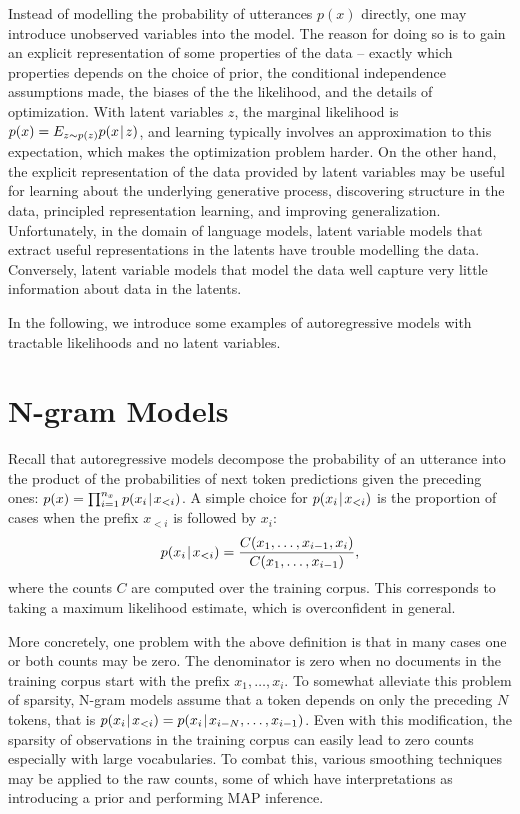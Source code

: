 \documentclass[12pt,a4paper,oneside]{book}
\newcommand{\tmid}{\hspace{0.08em}|\hspace{0.11em}}
\begin{document}
Instead of modelling the probability of utterances $p(x)$ directly, one may introduce unobserved variables into the model.
The reason for doing so is to gain an explicit representation of some properties of the data -- exactly which properties depends on the choice of prior, the conditional independence assumptions made, the biases of the the likelihood, and the details of optimization.
With latent variables $z$, the marginal likelihood is $p(x) = E_{z \sim p(z)} p(x\tmid z)$, and learning typically involves an approximation to this expectation, which makes the optimization problem harder.
On the other hand, the explicit representation of the data provided by latent variables may be useful for learning about the underlying generative process, discovering structure in the data, principled representation learning, and improving generalization.
Unfortunately, in the domain of language models, latent variable models that extract useful representations in the latents have trouble modelling the data.
Conversely, latent variable models that model the data well capture very little information about data in the latents.

In the following, we introduce some examples of autoregressive models with tractable likelihoods and no latent variables.

\section{N-gram Models}

Recall that autoregressive models decompose the probability of an utterance into the product of the probabilities of next token predictions given the preceding ones: $p(x)=\prod_{i=1}^{n_x}p(x_i\tmid x_{<i})$.
A simple choice for $p(x_i\tmid x_{<i})$ is the proportion of cases when the prefix $x_{<i}$ is followed by $x_i$:
{\def\groundprop{1.6}
\begin{equation*}
p(x_i\tmid x_{<i}) = \frac{C(x_1, \dots, x_{i-1}, x_i)}{C(x_1, \dots, x_{i-1})},
\end{equation*}}%
where the counts $C$ are computed over the training corpus.
This corresponds to taking a maximum likelihood estimate, which is overconfident in general.

More concretely, one problem with the above definition is that in many cases one or both counts may be zero.
The denominator is zero when no documents in the training corpus start with the prefix $x_1, \dots, x_i$.
To somewhat alleviate this problem of sparsity, N-gram models assume that a token depends on only the preceding $N$ tokens, that is $p(x_i\tmid x_{<i})=p(x_i\tmid x_{i-N}, \dots, x_{i-1})$.
Even with this modification, the sparsity of observations in the training corpus can easily lead to zero counts especially with large vocabularies.
To combat this, various smoothing techniques may be applied to the raw counts, some of which have interpretations as introducing a prior and performing MAP inference.
\end{document}
